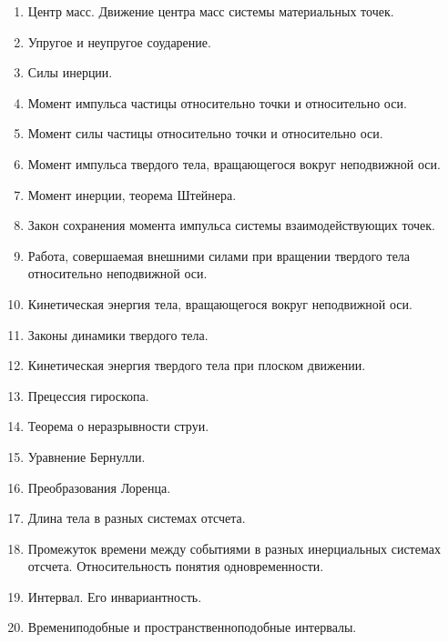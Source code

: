 \documentclass{article}
\begin{document}
\begin{enumerate}
\item Центр масс. Движение центра масс системы материальных точек.
\item Упругое и неупругое соударение.
\item Силы инерции.
\item Момент импульса частицы относительно точки и относительно оси.
\item Момент силы частицы относительно точки и относительно оси.
\item Момент импульса твердого тела, вращающегося вокруг неподвижной оси.
\item Момент инерции, теорема Штейнера.
\item Закон сохранения момента импульса системы взаимодействующих точек.
\item Работа, совершаемая внешними силами при вращении твердого тела относительно неподвижной оси.
\item Кинетическая энергия тела, вращающегося вокруг неподвижной оси.
\item Законы динамики твердого тела.
\item Кинетическая энергия твердого тела при плоском движении.
\item Прецессия гироскопа.
\item Теорема о неразрывности струи.
\item Уравнение Бернулли.
\item Преобразования Лоренца.
\item Длина тела в разных системах отсчета.
\item Промежуток времени между событиями в разных инерциальных системах отсчета. Относительность понятия одновременности.
\item Интервал. Его инвариантность.
\item Времениподобные и пространственноподобные интервалы.
\end{enumerate}
\normalsize

\clearpage
\end{document}
